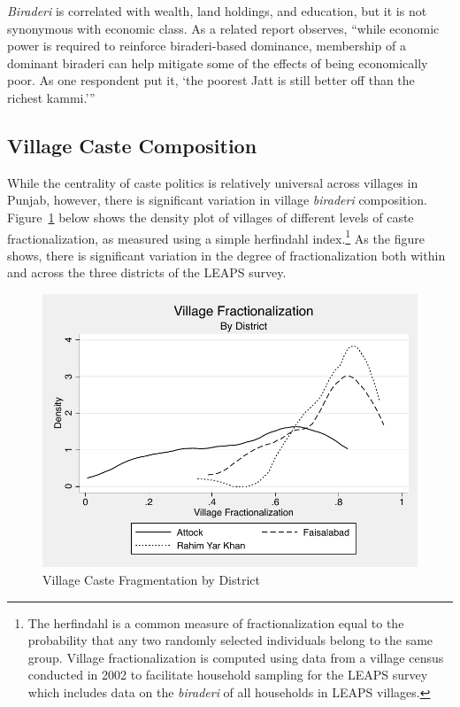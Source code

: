 \documentclass[Eubank_pk_ethnic_sorting.tex]{subfiles}
\begin{document}
\emph{Biraderi} is correlated with wealth, land holdings, and education, but it is not synonymous with economic class. As a related report observes, ``while economic power is required to reinforce biraderi-based dominance, membership of a dominant biraderi can help mitigate some of the effects of being economically poor. As one respondent put it, `the poorest Jatt is still better off than the richest kammi.''' \citep[p. 13]{Gazdar:2007vt}

\subsection{Village Caste Composition}\label{context_village_composition}

While the centrality of caste politics is relatively universal across villages in Punjab, however, there is significant variation in village \emph{biraderi} composition. Figure~\ref{fracdensities} below shows the density plot of villages of different levels of caste fractionalization, as measured using a simple herfindahl index.\footnote{The herfindahl is a common measure of fractionalization equal to the probability that any two randomly selected individuals belong to the same group. Village fractionalization is computed using data from a village census conducted in 2002 to facilitate household sampling for the LEAPS survey which includes data on the \emph{biraderi} of all households in LEAPS villages.} As the figure shows, there is significant variation in the degree of fractionalization both within and across the three districts of the LEAPS survey.

\begin{figure}[htb]
	\begin{center}
	\caption{Village Caste Fragmentation by District}\label{fracdensities}
	\includegraphics[scale=1.0]{../graphs/village_frac_by_district.pdf}
	\end{center}
\end{figure}
\end{document}
